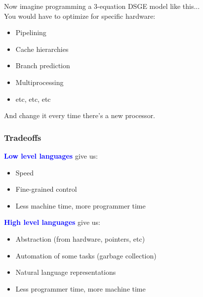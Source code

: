\documentclass[
  xcolor={svgnames},
  hyperref={colorlinks,citecolor=DeepPink4,linkcolor=DarkRed,urlcolor=DarkBlue}
  ]{beamer}  %
\newcommand\boldblue[1]{\textcolor{blue}{\textbf{#1}}}
\begin{document}
\begin{frame}
  Now imagine programming a 3-equation DSGE model like this... \\

  \vspace{1em}
  You would have to optimize for specific hardware:
  \begin{itemize}
    \item Pipelining
    \item Cache hierarchies
    \item Branch prediction
    \item Multiprocessing
    \item etc, etc, etc
  \end{itemize}

  \vspace{1em}
  \pause
  And change it every time there's a new processor.

\end{frame}

\begin{frame}
  \frametitle{Tradeoffs}

  \boldblue{Low level languages} give us:
  \begin{itemize}
    \item Speed
    \item Fine-grained control
    \item Less machine time, more programmer time
  \end{itemize}

  \pause

  \vspace{1em}
  \boldblue{High level languages} give us:
  \begin{itemize}
    \item Abstraction (from hardware, pointers, etc)
    \item Automation of some tasks (garbage collection)
    \item Natural language representations
    \item Less programmer time, more machine time
  \end{itemize}

\end{frame}
\end{document}
